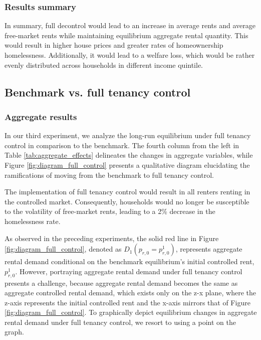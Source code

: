 \documentclass[parskip=full]{article}
\begin{document}
\subsubsection{Results summary}

In summary, full decontrol would lead to an increase in average rents and average free-market rents while maintaining equilibrium aggregate rental quantity. This would result in higher house prices and greater rates of homeownership homelessness. Additionally, it would lead to a welfare loss, which would be rather evenly distributed across households in different income quintile. 

\subsection{Benchmark vs. full tenancy control}\label{subsection:full_control}

\subsubsection{Aggregate results}

In our third experiment, we analyze the long-run equilibrium under full tenancy control in comparison to the benchmark. The fourth column from the left in Table \ref{tab:aggregate_effects} delineates the changes in aggregate variables, while Figure \ref{fig:diagram_full_control} presents a qualitative diagram elucidating the ramifications of moving from the benchmark to full tenancy control.

The implementation of full tenancy control would result in all renters renting in the controlled market. Consequently, households would no longer be susceptible to the volatility of free-market rents, leading to a 2\% decrease in the homelessness rate.

As observed in the preceding experiments, the solid red line in Figure \ref{fig:diagram_full_control}, denoted as $D_{1}(p_{r,0}=p^{1}_{r,0})$, represents aggregate rental demand conditional on the benchmark equilibrium's initial controlled rent, $p^{1}_{r,0}$. However, portraying aggregate rental demand under full tenancy control presents a challenge, because aggregate rental demand becomes the same as aggregate controlled rental demand, which exists only on the z-x plane, where the z-axis represents the initial controlled rent and the x-axis mirrors that of Figure \ref{fig:diagram_full_control}. To graphically depict equilibrium changes in aggregate rental demand under full tenancy control, we resort to using a point on the graph.
\end{document}
